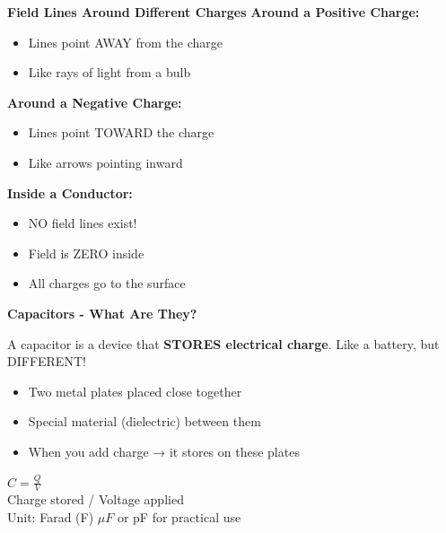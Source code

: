 \begin{frame}
\begin{frame}{\textbf{Field Lines Around Different Charges}}
\textbf{Around a Positive Charge:}
\begin{itemize}
	\item Lines point AWAY from the charge
	\item Like rays of light from a bulb
\end{itemize}

\vspace{0.2cm}

\textbf{Around a Negative Charge:}
\begin{itemize}
	\item Lines point TOWARD the charge
	\item Like arrows pointing inward
\end{itemize}

\vspace{0.2cm}

\textbf{Inside a Conductor:}
\begin{itemize}
	\item NO field lines exist!
	\item Field is ZERO inside
	\item All charges go to the surface
\end{itemize}

\end{frame}

\begin{frame}{\textbf{Capacitors - What Are They?}}

\begin{keybox}
A capacitor is a device that \textbf{STORES electrical charge}. Like a battery, but DIFFERENT!
\end{keybox}

\vspace{0.2cm}

\begin{examplebox}
\begin{itemize}
    \item Two metal plates placed close together
    \item Special material (dielectric) between them
    \item When you add charge → it stores on these plates
\end{itemize}
\end{examplebox}

\vspace{0.2cm}

\begin{formulabox}
$\displaystyle C = \frac{Q}{V}$ \\
{\normalsize Charge stored / Voltage applied} \\
{\normalsize Unit: Farad (F) {\normalsize$\mu F$ or pF for practical use}}
\end{formulabox}
\end{frame}


\end{frame}
